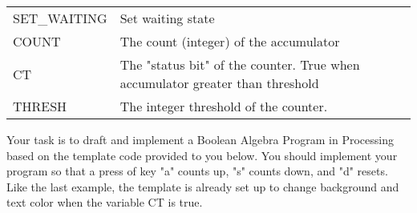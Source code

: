 \documentclass[11pt]{article}
\begin{document}
\begin{longtable}[]{@{}ll@{}}
\begin{minipage}[t]{0.05\columnwidth}\raggedright\strut
SET\_WAITING\strut
\end{minipage} & \begin{minipage}[t]{0.05\columnwidth}\raggedright\strut
Set waiting state\strut
\end{minipage}\tabularnewline
\begin{minipage}[t]{0.05\columnwidth}\raggedright\strut
COUNT\strut
\end{minipage} & \begin{minipage}[t]{0.05\columnwidth}\raggedright\strut
The count (integer) of the accumulator\strut
\end{minipage}\tabularnewline
\begin{minipage}[t]{0.05\columnwidth}\raggedright\strut
CT\strut
\end{minipage} & \begin{minipage}[t]{0.05\columnwidth}\raggedright\strut
The "status bit" of the counter. True when accumulator greater than
threshold\strut
\end{minipage}\tabularnewline
\begin{minipage}[t]{0.05\columnwidth}\raggedright\strut
THRESH\strut
\end{minipage} & \begin{minipage}[t]{0.05\columnwidth}\raggedright\strut
The integer threshold of the counter.\strut
\end{minipage}\tabularnewline
\bottomrule
\end{longtable}

Your task is to draft and implement a Boolean Algebra Program in
Processing based on the template code provided to you below. You should
implement your program so that a press of key "a" counts up, "s" counts
down, and "d" resets. Like the last example, the template is already set
up to change background and text color when the variable CT is true.
\end{document}
